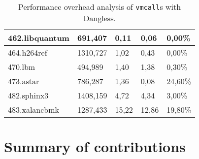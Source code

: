 \begin{table}[]
\begin{tabular}{|l|l|l|l|l|}
		462.libquantum     & 691,407                                                                          & 0,11                                                                & 0,06                                                                            & 0,00\%                                                                         \\ \hline
		464.h264ref        & 1310,727                                                                         & 1,02                                                                & 0,43                                                                            & 0,00\%                                                                         \\ \hline
		470.lbm            & 494,989                                                                          & 1,40                                                                & 1,38                                                                            & 0,30\%                                                                         \\ \hline
		473.astar          & 786,287                                                                          & 1,36                                                                & 0,08                                                                            & 24,60\%                                                                        \\ \hline
		482.sphinx3        & 1408,159                                                                         & 4,72                                                                & 4,34                                                                            & 3,00\%                                                                         \\ \hline
		483.xalancbmk      & 1287,433                                                                         & 15,22                                                               & 12,86                                                                           & 19,80\%                                                                        \\ \hline
	\end{tabular}
	\caption{Performance overhead analysis of \texttt{vmcall}s with Dangless.}
	\label{tab:dangless-vmcall-analysis}
\end{table}

\section{Summary of contributions}

